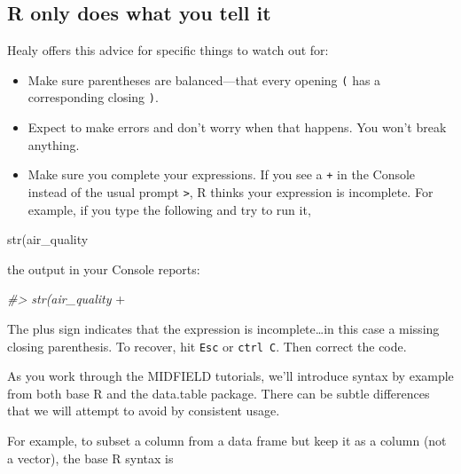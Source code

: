 \documentclass[
]{book}
\newenvironment{Shaded}{\begin{snugshade}}{\end{snugshade}}
\newcommand{\CommentTok}[1]{\textcolor[rgb]{0.56,0.35,0.01}{\textit{#1}}}
\newcommand{\FunctionTok}[1]{\textcolor[rgb]{0.00,0.00,0.00}{#1}}
\newcommand{\NormalTok}[1]{#1}
\newcommand{\SpecialCharTok}[1]{\textcolor[rgb]{0.00,0.00,0.00}{#1}}
\providecommand{\tightlist}{%
  \setlength{\itemsep}{0pt}\setlength{\parskip}{0pt}}
\begin{document}
\hypertarget{r-only-does-what-you-tell-it}{%
\subsection{R only does what you tell it}\label{r-only-does-what-you-tell-it}}

Healy \citeyearpar{Healy:2019} offers this advice for specific things to watch out for:

\begin{itemize}
\tightlist
\item
  Make sure parentheses are balanced---that every opening \texttt{(} has a corresponding closing \texttt{)}.\\
\item
  Expect to make errors and don't worry when that happens. You won't break anything.
\item
  Make sure you complete your expressions. If you see a \texttt{+} in the Console instead of the usual prompt \texttt{\textgreater{}}, R thinks your expression is incomplete. For example, if you type the following and try to run it,
\end{itemize}

\begin{Shaded}
\begin{Highlighting}[]
    \FunctionTok{str}\NormalTok{(air\_quality}
\end{Highlighting}
\end{Shaded}

the output in your Console reports:

\begin{Shaded}
\begin{Highlighting}[]
    \CommentTok{\#\textgreater{} str(air\_quality}
    \SpecialCharTok{+} 
\end{Highlighting}
\end{Shaded}

The plus sign indicates that the expression is incomplete\ldots in this case a missing closing parenthesis. To recover, hit \texttt{Esc} or \texttt{ctrl\ C}. Then correct the code.

As you work through the MIDFIELD tutorials, we'll introduce syntax by example from both base R and the data.table package. There can be subtle differences that we will attempt to avoid by consistent usage.

For example, to subset a column from a data frame but keep it as a column (not a vector), the base R syntax is
\end{document}
